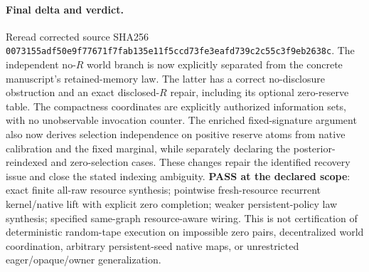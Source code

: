 \documentclass{article}\usepackage{amsmath,amssymb,url}
\begin{document}
\paragraph{Final delta and verdict.} Reread corrected source SHA256 \texttt{0073155adf50e9f77671f7fab135e11f5ccd73fe3eafd739c2c55c3f9eb2638c}. The independent no-$R$ world branch is now explicitly separated from the concrete manuscript's retained-memory law. The latter has a correct no-disclosure obstruction and an exact disclosed-$R$ repair, including its optional zero-reserve table. The compactness coordinates are explicitly authorized information sets, with no unobservable invocation counter. The enriched fixed-signature argument also now derives selection independence on positive reserve atoms from native calibration and the fixed marginal, while separately declaring the posterior-reindexed and zero-selection cases. These changes repair the identified recovery issue and close the stated indexing ambiguity. \textbf{PASS at the declared scope}: exact finite all-raw resource synthesis; pointwise fresh-resource recurrent kernel/native lift with explicit zero completion; weaker persistent-policy law synthesis; specified same-graph resource-aware wiring. This is not certification of deterministic random-tape execution on impossible zero pairs, decentralized world coordination, arbitrary persistent-seed native maps, or unrestricted eager/opaque/owner generalization.
\end{document}
